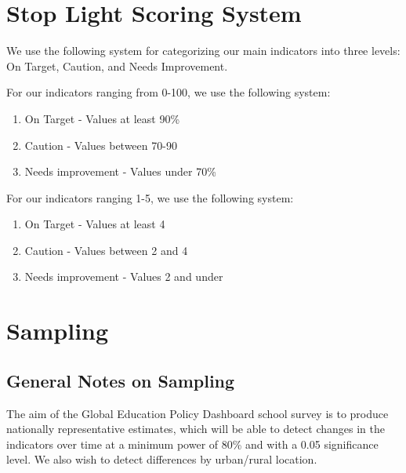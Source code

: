 \documentclass[]{article}
\providecommand{\tightlist}{%
  \setlength{\itemsep}{0pt}\setlength{\parskip}{0pt}}
\begin{document}
\hypertarget{stop-light-scoring-system}{%
\section{Stop Light Scoring System}\label{stop-light-scoring-system}}

We use the following system for categorizing our main indicators into
three levels: On Target, Caution, and Needs Improvement.

For our indicators ranging from 0-100, we use the following system:

\begin{enumerate}
\def\labelenumi{\arabic{enumi}.}
\tightlist
\item
  On Target - Values at least 90\%\\
\item
  Caution - Values between 70-90\\
\item
  Needs improvement - Values under 70\%
\end{enumerate}

For our indicators ranging 1-5, we use the following system:

\begin{enumerate}
\def\labelenumi{\arabic{enumi}.}
\tightlist
\item
  On Target - Values at least 4\\
\item
  Caution - Values between 2 and 4\\
\item
  Needs improvement - Values 2 and under
\end{enumerate}

\hypertarget{sampling}{%
\section{Sampling}\label{sampling}}

\hypertarget{general-notes-on-sampling}{%
\subsection{General Notes on Sampling}\label{general-notes-on-sampling}}

The aim of the Global Education Policy Dashboard school survey is to
produce nationally representative estimates, which will be able to
detect changes in the indicators over time at a minimum power of 80\%
and with a 0.05 significance level. We also wish to detect differences
by urban/rural location.
\end{document}
